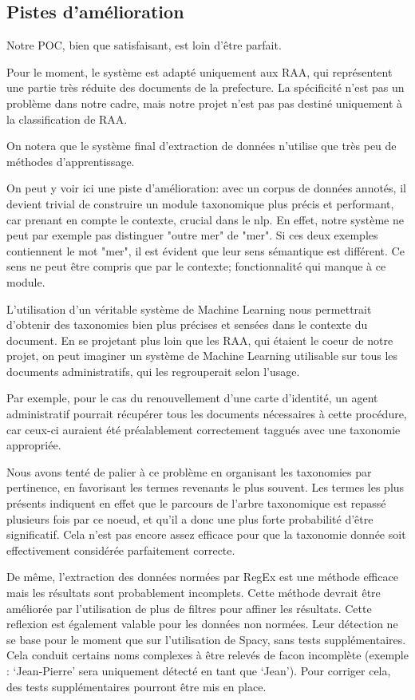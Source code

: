 
\subsection {Pistes d'amélioration}
Notre POC, bien que satisfaisant, est loin d'être parfait.

Pour le moment, le système est adapté uniquement aux RAA, qui représentent une partie très réduite des documents de la prefecture.
La spécificité n'est pas un problème dans notre cadre, mais notre projet n'est pas pas destiné uniquement à la classification de RAA.

On notera que le système final d'extraction de données n'utilise que très peu de méthodes d'apprentissage.

On peut y voir ici une piste d'amélioration: avec un corpus de données annotés, il devient trivial de construire un module taxonomique plus précis et performant, car prenant en compte le contexte, crucial dans le \gls{nlp}.
En effet, notre système ne peut par exemple pas distinguer "outre mer" de "mer".
Si ces deux exemples contiennent le mot "mer", il est évident que leur sens sémantique est différent.
Ce sens ne peut être compris que par le contexte; fonctionnalité qui manque à ce module. 

L'utilisation d'un véritable système de Machine Learning nous permettrait d'obtenir des taxonomies bien plus précises et sensées dans le contexte du document.
En se projetant plus loin que les RAA, qui étaient le coeur de notre projet, on peut imaginer un système de Machine Learning utilisable sur tous les documents administratifs, qui les regrouperait selon l'usage.

Par exemple, pour le cas du renouvellement d'une carte d'identité, un agent administratif pourrait récupérer tous les documents nécessaires à cette procédure, car ceux-ci auraient été préalablement correctement taggués avec une taxonomie appropriée. 

Nous avons tenté de palier à ce problème en organisant les taxonomies par pertinence, en favorisant les termes revenants le plus souvent.
Les termes les plus présents indiquent en effet que le parcours de l'arbre taxonomique est repassé plusieurs fois par ce noeud, et qu'il a donc une plus forte probabilité d'être significatif.
Cela n'est pas encore assez efficace pour que la taxonomie donnée soit effectivement considérée parfaitement correcte.


De même, l'extraction des données normées par RegEx est une méthode efficace mais les résultats sont probablement incomplets.
Cette méthode devrait être améliorée par l'utilisation de plus de filtres pour affiner les résultats.
Cette reflexion est également valable pour les données non normées.
Leur détection ne se base pour le moment que sur l'utilisation de Spacy, sans tests supplémentaires.
Cela conduit certains noms complexes à être relevés de facon incomplète (exemple : `Jean-Pierre' sera uniquement détecté en tant que `Jean').
Pour corriger cela, des tests supplémentaires pourront être mis en place.


